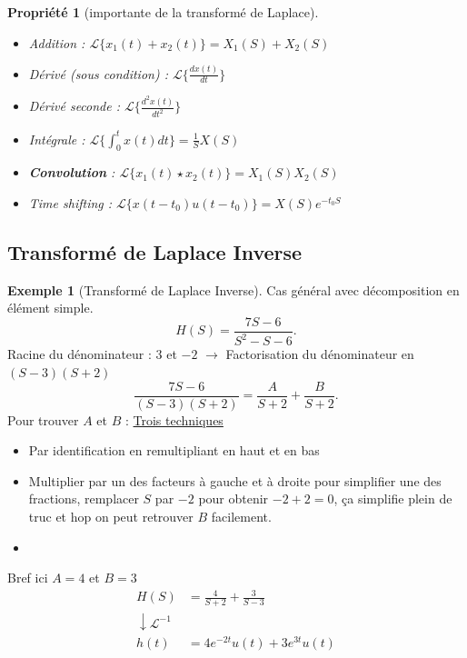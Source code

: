 \documentclass{article}
\theoremstyle{plain}%
\newtheorem{prop}[thm]{Propriété}
\theoremstyle{definition}
\newtheorem{exmp}{Exemple}[section]
\theoremstyle{remark}
\begin{document}
\begin{prop}[importante de la transformé de Laplace]
    \begin{itemize}
        \item Addition : $ \mathcal{L}\{x_1(t) + x_2(t)\} = X_1(S) + X_2(S)$ 
        \item Dérivé (sous condition) : $ \mathcal{L}\{\frac{dx(t)}{dt}\} $ 
        \item Dérivé seconde : $ \mathcal{L}\{\frac{d^2x(t)}{dt^2}\} $ 
        \item Intégrale : $ \mathcal{L}\{\int_{0}^{t}x(t)dt\} = \frac{1}{S}X(S) $ 
        \item \textbf{Convolution} : $ \mathcal{L}\{x_1(t) \star x_2(t)\} = X_1(S) X_2(S)$ 
        \item Time shifting : $ \mathcal{L}\{x(t-t_0) u(t - t_0)\} = X(S)e^{-t_0 S}$ 
    \end{itemize}
\end{prop}

\subsection{Transformé de Laplace Inverse}

\begin{exmp}[Transformé de Laplace Inverse]
    Cas général avec décomposition en élément simple.
    \[
        H(S) = \frac{7S - 6}{S^2 - S - 6}
    .\]
    Racine du dénominateur : $ 3 $ et $ -2 $ $\rightarrow$ Factorisation du dénominateur en $ (S-3)(S+2) $ 
    \[
        \frac{7S-6}{(S-3)(S+2)} = \frac{A}{S+2} + \frac{B}{S+2}
    .\]
    Pour trouver $ A $ et $ B $ : \href{https://www.methodemaths.fr/decomposition_elements_simples/#principe}{Trois techniques} \begin{itemize}
        \item Par identification en remultipliant en haut et en bas 
        \item Multiplier par un des facteurs à gauche et à droite pour simplifier une des fractions, remplacer $ S $ par $ -2 $ pour obtenir $ -2+2 = 0 $, ça simplifie plein de truc et hop on peut retrouver $ B $ facilement.
        \item 
    \end{itemize}
    Bref ici $ A = 4 $ et $ B=3 $ \begin{align*}
        H(S) &= \frac{4}{S+2}  + \frac{3}{S - 3} \\
        \downarrow \mathcal{L}^{-1}& \\
            h(t) &= 4 e^{-2t} u(t) + 3 e^{3t} u(t)
    \end{align*}
\end{exmp}
\end{document}
